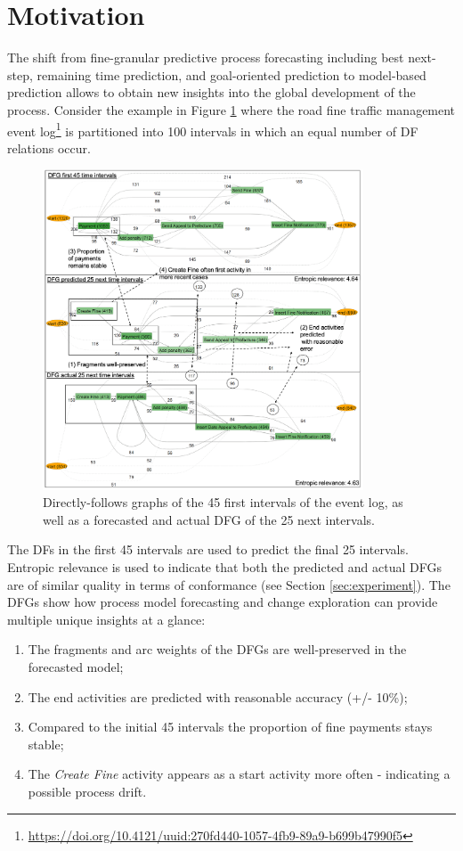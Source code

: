 \section{Motivation}\label{sec:2:motivation}

The shift from fine-granular predictive process forecasting including best next-step, remaining time prediction, and goal-oriented prediction to model-based prediction allows to obtain new insights into the global development of the process.
Consider the example in Figure \ref{fig:dfg_example_intro} where the road fine traffic management event log\footnote{\url{https://doi.org/10.4121/uuid:270fd440-1057-4fb9-89a9-b699b47990f5}} is partitioned into 100 intervals in which an equal number of DF relations occur.
\begin{figure}
    \centering
    \includegraphics[width=0.85\textwidth]{img/MotExample2.png}
    \caption{Directly-follows graphs of the 45 first intervals of the event log, as well as a forecasted and actual DFG of the 25 next intervals.}
    \label{fig:dfg_example_intro}
\end{figure}
The DFs in the first 45 intervals are used to predict the final 25 intervals.
Entropic relevance \cite{DBLP:conf/icpm/PolyvyanyyMG20} is used to indicate that both the predicted and actual DFGs are of similar quality in terms of conformance (see Section \ref{sec:experiment}).
The DFGs show how process model forecasting and change exploration can provide multiple unique insights at a glance:
\begin{enumerate}
    \item The fragments and arc weights of the DFGs are well-preserved in the forecasted model;
    \item The end activities are predicted with reasonable accuracy (+/- 10\%);
    \item Compared to the initial 45 intervals the proportion of fine payments stays stable;
    \item The \emph{Create Fine} activity appears as a start activity more often - indicating a possible process drift.
\end{enumerate}
